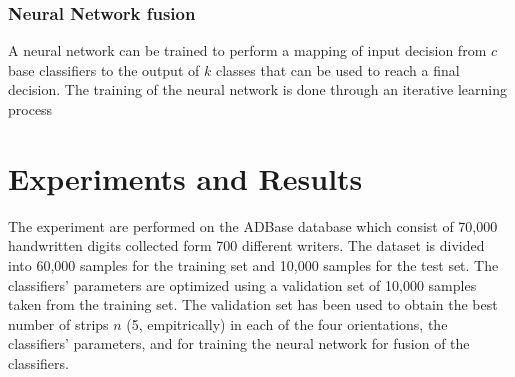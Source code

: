 \documentclass[conference]{IEEEtran}
\begin{document}
\subsubsection{Neural Network fusion}
 A neural network can be trained to perform a mapping of input decision from $c$  base classifiers to the output of  $k$ classes that can be used to reach a final decision. The training of the neural network is done through an iterative learning process


\section {Experiments and Results}
\label{sec:Results}
The experiment are performed on the ADBase database which consist of 70,000 handwritten digits collected form 700 different writers. The dataset is divided into 60,000 samples for the training set and 10,000 samples for the test set. The classifiers' parameters are optimized using a validation set of 10,000 samples taken from the training set. The validation set has been used to obtain the best number of strips $n$ (5, empitrically) in each of the four orientations, the classifiers' parameters, and for training the neural network for fusion of the classifiers.
\end{document}
